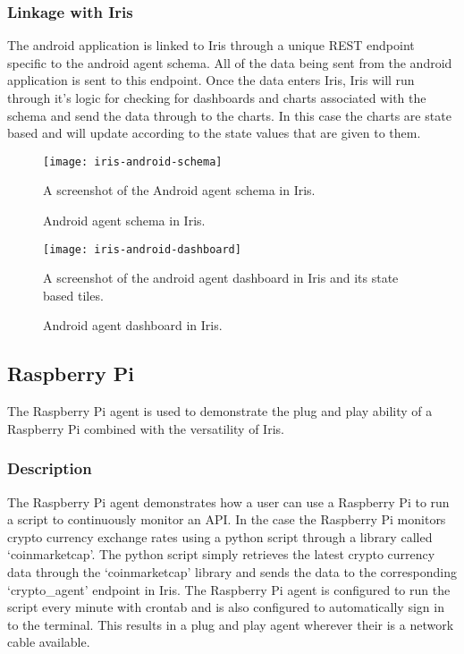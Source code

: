 \documentclass[12pt,a4paper,titlepage]{report}
\begin{document}
\subsubsection{Linkage with Iris}
The android application is linked to Iris through a unique REST endpoint specific to the android agent schema. All of the data being sent from the android application is sent to this endpoint. Once the data enters Iris, Iris will run through it's logic for checking for dashboards and charts associated with the schema and send the data through to the charts. 
In this case the charts are state based and will update according to the state values that are given to them.

\begin{figure}[H]
\begin{tcolorbox}
\begin{center}
\texttt{[image: iris-android-schema]}
\end{center}
A screenshot of the Android agent schema in Iris.
\end{tcolorbox}
\caption{Android agent schema in Iris.}
\end{figure}

\begin{figure}[H]
\begin{tcolorbox}
\begin{center}
\texttt{[image: iris-android-dashboard]}
\end{center}
A screenshot of the android agent dashboard in Iris and its state based tiles.
\end{tcolorbox}
\caption{Android agent dashboard in Iris.}
\end{figure}

\subsection{Raspberry Pi}
The Raspberry Pi agent is used to demonstrate the plug and play ability of a Raspberry Pi combined with the versatility of Iris.

\subsubsection{Description}
The Raspberry Pi agent demonstrates how a user can use a Raspberry Pi to run a script to continuously monitor an API. In the case the Raspberry Pi monitors crypto currency exchange rates using a python script through a library called `coinmarketcap'. The python script simply retrieves the latest crypto currency data through the `coinmarketcap' library and sends the data to the corresponding `crypto\_agent' endpoint in Iris. The Raspberry Pi agent is configured to run the script every minute with crontab and is also configured to automatically sign in to the terminal. This results in a plug and play agent wherever their is a network cable available.
\end{document}
